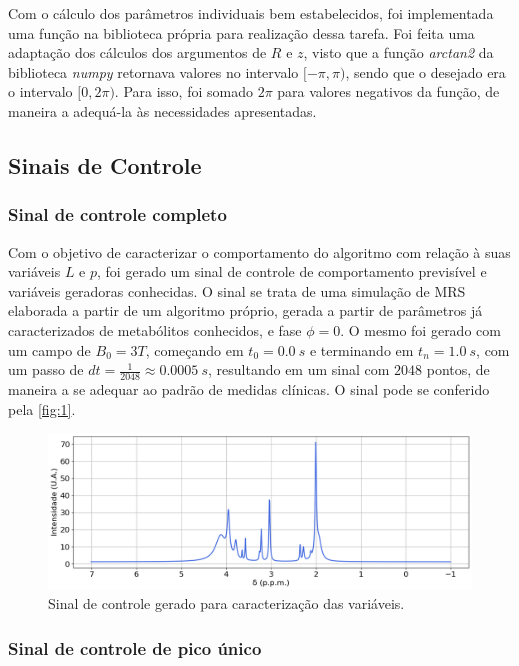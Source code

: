 \documentclass[12pt]{article}
\begin{document}
Com o cálculo dos parâmetros individuais bem estabelecidos, foi implementada uma função na biblioteca própria para realização dessa tarefa. Foi feita uma 
adaptação dos cálculos dos argumentos de $R$ e $z$, visto que a função \textit{arctan2} da biblioteca \textit{numpy} retornava valores no intervalo $[-\pi, \pi)$, 
sendo que o desejado era o intervalo $[0, 2\pi)$. Para isso, foi somado $2\pi$ para valores negativos da função, de maneira a adequá-la às necessidades apresentadas. 

\subsection{Sinais de Controle}

\subsubsection{Sinal de controle completo} \label{sec:sinal-completo}

Com o objetivo de caracterizar o comportamento do algoritmo com relação à suas variáveis $L$ e $p$, foi gerado um sinal de controle 
de comportamento previsível e variáveis geradoras conhecidas. O sinal se trata de uma simulação de MRS elaborada a partir de um algoritmo 
próprio, gerada a partir de parâmetros já caracterizados de metabólitos conhecidos, e fase $\phi = 0$. O mesmo foi gerado com um campo de $B_0 = 3T$, começando em 
$t_0 = 0.0 \ s$ e terminando em $t_n = 1.0 \ s$, com um passo de $dt = \frac{1}{2048} \approx 0.0005 \ s$, resultando em um sinal com $2048$ pontos, de maneira 
a se adequar ao padrão de medidas clínicas. O sinal pode se conferido pela \autoref{fig:1}.

\begin{figure} [H]
    \includegraphics[scale=0.5]{sinal-de-controle.png}
    \centering
    \caption{Sinal de controle gerado para caracterização das variáveis.}
    \label{fig:1}
\end{figure}

\subsubsection{Sinal de controle de pico único} \label{sec:sinal-unico}
\end{document}
